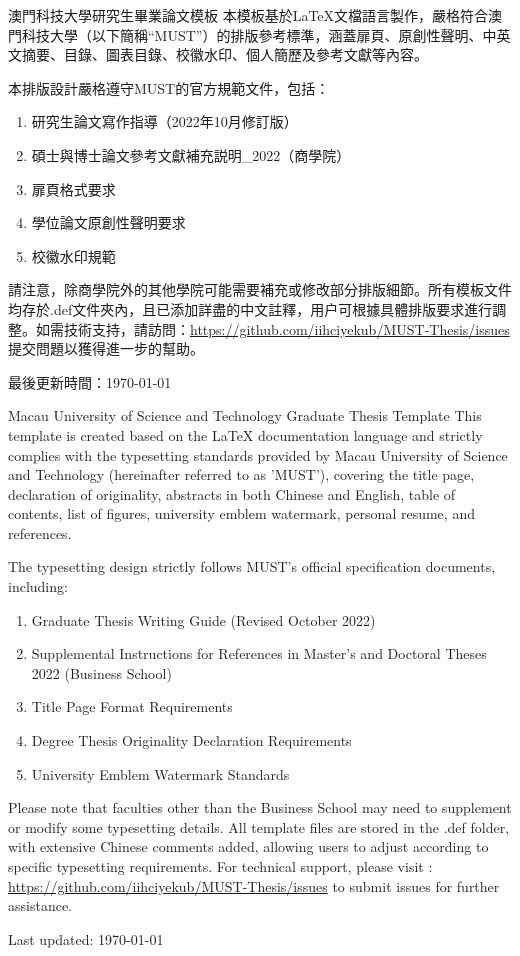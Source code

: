 \documentclass[
    writingLanguage=chinese, %
    addPageTitle=on,  %
    addDeclaration=on, %
    addMUSTlog=off, %
    addFigTOC=on, %
    addTabTOC=on, %
    refIndent=off, %
    printMod=off, %
]{must}
\begin{document}
\begin{abstract@cn}{澳門科技大學研究生畢業論文模板}
本模板基於\LaTeX{}文檔語言製作，嚴格符合澳門科技大學（以下簡稱“MUST”）的排版參考標準，涵蓋扉頁、原創性聲明、中英文摘要、目錄、圖表目錄、校徽水印、個人簡歷及參考文獻等內容。

\noindent 本排版設計嚴格遵守MUST的官方規範文件，包括：
\begin{enumerate}[label=\arabic*).]
\item 研究生論文寫作指導（2022年10月修訂版）
\item 碩士與博士論文參考文獻補充説明\_2022（商學院）
\item 扉頁格式要求
\item 學位論文原創性聲明要求
\item 校徽水印規範
\end{enumerate}
請注意，除商學院外的其他學院可能需要補充或修改部分排版細節。所有模板文件均存於.def文件夾內，且已添加詳盡的中文註釋，用户可根據具體排版要求進行調整。如需技術支持，請訪問\faGithub：\url{https://github.com/iihciyekub/MUST-Thesis/issues} 提交問題以獲得進一步的幫助。

\noindent 最後更新時間：\datea\today

\end{abstract@cn}

\begin{abstract@en}{Macau University of Science and Technology Graduate Thesis Template}
This template is created based on the \LaTeX{} documentation language and strictly complies with the typesetting standards provided by Macau University of Science and Technology (hereinafter referred to as 'MUST'), covering the title page, declaration of originality, abstracts in both Chinese and English, table of contents, list of figures, university emblem watermark, personal resume, and references.

\noindent The typesetting design strictly follows MUST's official specification documents, including:
\begin{enumerate}[label=\arabic*).]
\item Graduate Thesis Writing Guide (Revised October 2022)
\item Supplemental Instructions for References in Master's and Doctoral Theses 2022 (Business School)
\item Title Page Format Requirements
\item Degree Thesis Originality Declaration Requirements
\item University Emblem Watermark Standards
\end{enumerate}
Please note that faculties other than the Business School may need to supplement or modify some typesetting details. All template files are stored in the .def folder, with extensive Chinese comments added, allowing users to adjust according to specific typesetting requirements. For technical support, please visit \faGithub: \url{https://github.com/iihciyekub/MUST-Thesis/issues} to submit issues for further assistance.

\noindent Last updated: \dateb\today

\end{abstract@en}
\end{document}
